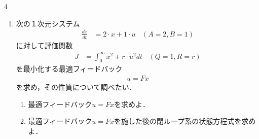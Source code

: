 


\begin{multicols}{4}
\begin{enumerate}

\item
次の１次元システム
\begin{align}
	\frac{dx}{dt} &= 2 \cdot x + 1 \cdot u
	\ \ \ \  (A=2, B=1) 
\nonumber
\end{align}
に対して評価関数
\begin{align}
	J &= \int_0^\infty x^2 + r \cdot u^2 dt
	\ \ \ \  (Q=1, R=r)
\nonumber
\end{align}
を最小化する最適フィードバック
\begin{align}
	u=Fx
\nonumber
\end{align}
を求め，その性質について調べたい．

\begin{enumerate}
%
%
\item
最適フィードバック$u=Fx$を求めよ．
\vspace{11cm}

\item
最適フィードバック$u=Fx$を施した後の閉ループ系の状態方程式を求めよ．
\vspace{4cm}


\end{enumerate}
\end{enumerate}
\end{multicols}
